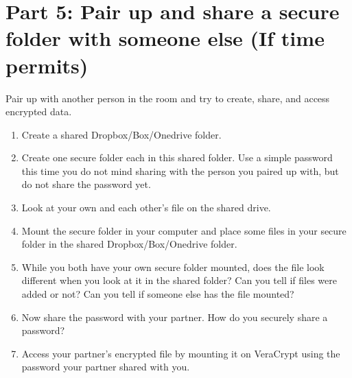 \documentclass{tufte-handout}
\begin{document}
\section{Part 5: Pair up and share a secure folder with someone else (If time permits)}
Pair up with another person in the room and try to create, share, and access encrypted data.
\begin{enumerate}
	\item Create a shared Dropbox/Box/Onedrive folder.
	\item Create one secure  folder each in this shared folder. Use a simple password this time you do not mind sharing with the person you paired up with, but do not share the password yet.
	\item Look at your own and each other's file on the shared drive.
	\item Mount the secure folder in your computer and place some files in your secure folder in the shared Dropbox/Box/Onedrive folder.
	\item While you both have your own secure folder mounted, does the file look different when you look at it in the shared folder? Can you tell if files were added or not? Can you tell if someone else has the file mounted?
	\item Now share the password with your partner. How do you securely share a password?
	\item Access your partner's encrypted file by mounting it on VeraCrypt using the password your partner shared with you.
\end{enumerate}
\end{document}
